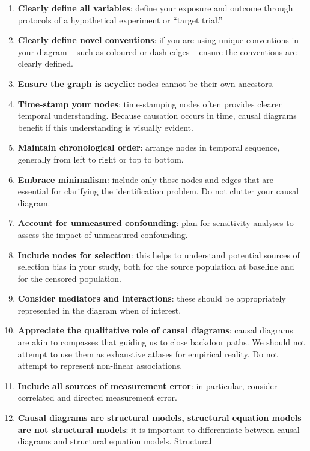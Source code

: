 \documentclass[
  singlecolumn]{report}
\begin{document}
\begin{enumerate}
\def\labelenumi{\arabic{enumi}.}
\item
  \textbf{Clearly define all variables}: define your exposure and
  outcome through protocols of a hypothetical experiment or ``target
  trial.''
\item
  \textbf{Clearly define novel conventions}: if you are using unique
  conventions in your diagram -- such as coloured or dash edges --
  ensure the conventions are clearly defined.
\item
  \textbf{Ensure the graph is acyclic}: nodes cannot be their own
  ancestors.
\item
  \textbf{Time-stamp your nodes}: time-stamping nodes often provides
  clearer temporal understanding. Because causation occurs in time,
  causal diagrams benefit if this understanding is visually evident.
\item
  \textbf{Maintain chronological order}: arrange nodes in temporal
  sequence, generally from left to right or top to bottom.
\item
  \textbf{Embrace minimalism}: include only those nodes and edges that
  are essential for clarifying the identification problem. Do not
  clutter your causal diagram.
\item
  \textbf{Account for unmeasured confounding}: plan for sensitivity
  analyses to assess the impact of unmeasured confounding.
\item
  \textbf{Include nodes for selection}: this helps to understand
  potential sources of selection bias in your study, both for the source
  population at baseline and for the censored population.
\item
  \textbf{Consider mediators and interactions}: these should be
  appropriately represented in the diagram when of interest.
\item
  \textbf{Appreciate the qualitative role of causal diagrams}: causal
  diagrams are akin to compasses that guiding us to close backdoor
  paths. We should not attempt to use them as exhaustive atlases for
  empirical reality. Do not attempt to represent non-linear
  associations.
\item
  \textbf{Include all sources of measurement error}: in particular,
  consider correlated and directed measurement error.
\item
  \textbf{Causal diagrams are structural models, structural equation
  models are not structural models}: it is important to differentiate
  between causal diagrams and structural equation models. Structural

\end{enumerate}
\end{document}
